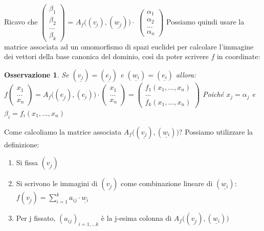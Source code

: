\documentclass[12pt]{article}
\newenvironment{para}{\begin{adjustwidth}{13mm}{}}{\end{adjustwidth}}
\newtheorem{Osservazione}{Osservazione}[subsection]
\begin{document}
\begin{para}
Ricavo che $\begin{pmatrix}
    \beta_1 \\
    \beta_2 \\
    ...\\
    \beta_k
\end{pmatrix}$ = $A_f\bigl((\underline{v_i}), (\underline{w_j})\bigr) \cdot$ $\begin{pmatrix}
    \alpha_1 \\
    \alpha_2 \\
    ...\\
    \alpha_n
\end{pmatrix}$\newline
Possiamo quindi usare la matrice associata ad un omomorfismo di spazi euclidei per calcolare l'immagine dei vettori della base canonica del dominio, così da poter scrivere $f$ in coordinate:
\begin{Osservazione}
    Se $(\underline{v_j}) = (\underline{e_j})$ e $(\underline{w_i}) = (\underline{e_i})$ allora: \newline $f\begin{pmatrix}
        x_1 \\
        ...\\
        x_n
    \end{pmatrix} = A_f\bigl((\underline{e_j}), (\underline{e_i})\bigr) \cdot \begin{pmatrix}
        x_1 \\
        ...\\
        x_n
    \end{pmatrix} = \begin{pmatrix}
        f_1(x_1, ..., x_n) \\
        ...\\
        f_k(x_1, ..., x_n)
    \end{pmatrix}$ \newline
Poiché $x_j = \alpha_j$ e $\beta_i = f_i(x_1, ..., x_n)$
\end{Osservazione}
Come calcoliamo la matrice associata $A_f\bigl((\underline{v_j}), (\underline{w_i})\bigr)$? Possiamo utilizzare la definizione:
\begin{enumerate}
    \item Si fissa $(\underline{v_j})$
    \item Si scrivono le immagini di $(\underline{v_j})$ come combinazione lineare di $(\underline{w_i})$:
    $f(\underline{v_j}) = \sum_{i=1}^k a_{ij} \cdot \underline{w_i}$
    \item Per j fissato, $(a_{ij})_{i = 1,...k}$ è la j-esima colonna di $A_f\bigl((\underline{v_j}), (\underline{w_i})\bigr)$

\end{enumerate}
\end{para}
\end{document}
